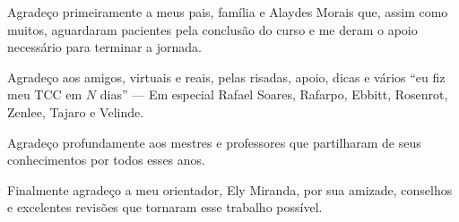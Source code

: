 \begin{agradecimentos}
	Agradeço primeiramente a meus pais, família e Alaydes Morais que, assim como muitos, aguardaram pacientes pela conclusão do curso e me deram o apoio necessário para terminar a jornada.
    
    Agradeço aos amigos, virtuais e reais, pelas risadas, apoio, dicas e vários ``eu fiz meu TCC em \(N\) dias'' --- Em especial Rafael Soares, Rafarpo, Ebbitt, Rosenrot, Zenlee, Tajaro e Velinde.
    
    Agradeço profundamente aos mestres e professores que partilharam de seus conhecimentos por todos esses anos.
    
    Finalmente agradeço a meu orientador, Ely Miranda, por sua amizade, conselhos e excelentes revisões que tornaram esse trabalho possível.
\end{agradecimentos}